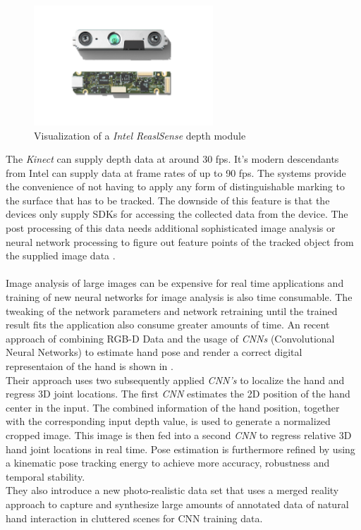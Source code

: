 \begin{figure}[H]
\centering
\includegraphics[width=0.6\textwidth]{images/RealSense.png}
\caption{Visualization of a \textit{Intel ReaslSense} depth module\cite{IntelCorporation.2018}}
\label{img:realsense} 
\end{figure}
The \textit{Kinect} can supply depth data at around 30 fps. It's modern descendants from Intel can supply data at frame rates of up to 90 fps. The systems provide the convenience of not having to apply any form of distinguishable marking to the surface that has to be tracked. The downside of this feature is that the devices only supply SDKs for accessing the collected data from the device. The post processing of this data needs additional sophisticated image analysis or neural network processing to figure out feature points of the tracked object from the supplied image data \cite{JamieShotton.2011,Oikonomidis.2011b}.
\\\\Image analysis of large images can be expensive for real time applications and training of new neural networks for image analysis is also time consumable. The tweaking of the network parameters and network retraining until the trained result fits the application also consume greater amounts of time. An recent approach of combining RGB-D Data and the usage of\textit{ CNNs} (Convolutional Neural Networks) to estimate hand pose and render a correct digital representaion of the hand is shown in \cite{Mueller.2017}.
\\Their approach uses two subsequently applied \textit{CNN's} to localize the hand and regress 3D joint locations. The first \textit{CNN} estimates the 2D position of the hand center in the input. The combined information of the hand position, together with the corresponding input depth value, is used to generate a normalized cropped image. This image is then fed into a second \textit{CNN} to regress relative 3D hand joint
locations in real time. Pose estimation is furthermore refined by using a kinematic pose tracking energy to achieve more accuracy, robustness and
temporal stability.
\\They also introduce a new photo-realistic data set that uses a merged reality approach to capture and synthesize large amounts of annotated data of natural hand interaction in cluttered scenes for CNN training data.